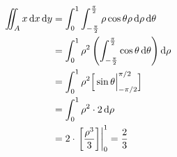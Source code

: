 \begin{align*}
    \iint_A x \mathop{}\!\mathrm{d}{x}\mathop{}\!\mathrm{d}{y} & = \int_{0}^{1} \int_{- \frac{\pi}{2}}^{ \frac{\pi}{2}} \rho \cos \theta \rho \mathop{}\!\mathrm{d}{\rho}  \mathop{}\!\mathrm{d}{\theta}             \\
                               & = \int_{0}^{1} \rho^{2} \left(\int_{- \frac{\pi}{2}}^{ \frac{\pi}{2}} \cos \theta \mathop{}\!\mathrm{d}{\theta} \right) \mathop{}\!\mathrm{d}{\rho} \\
                               & = \int_{0}^{1} \rho^{2}\Big[\sin \theta\Big|_{ - \pi/2}^{ \pi/2} \Big]                                  \\
                               & = \int_{0}^{1} \rho^{2}\cdot2 \mathop{}\!\mathrm{d}{\rho}                                                                           \\
                               & = 2 \cdot \left.\left[ \frac{\rho^{3}}{3} \right]\right\rvert_{0}^{1} = \frac{2}{3}
\end{align*}
